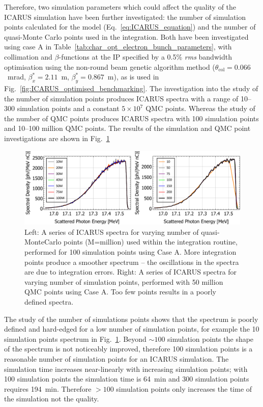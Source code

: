 \documentclass[../main.tex]{subfiles}
\begin{document}
Therefore, two simulation parameters which could affect the quality of the \textsc{ICARUS} simulation have been further investigated: the number of simulation points calculated for the model (Eq.~\ref{eq:ICARUS_equation}) and the number of quasi-Monte Carlo points used in the integration. Both have been investigated using case A in Table~\ref{tab:char_opt_electron_bunch_parameters}, with collimation and $\beta$-functions at the IP specified by a 0.5\% \textit{rms} bandwidth optimisation using the non-round beam genetic algorithm method ($\theta_{\mathrm{col}}=0.066$~\si{\milli\radian}, $\beta_{x}^{*}=2.11$~\si{\meter}, $\beta_{y}^{*}=0.867$~\si{\meter}), as is used in Fig.~\ref{fig:ICARUS_optimised_benchmarking}. The investigation into the study of the number of simulation points produces \textsc{ICARUS} spectra with a range of 10--300 simulation points and a constant $5\times 10^{7}$ QMC points. Whereas the study of the number of QMC points produces \textsc{ICARUS} spectra with 100 simulation points and 10--100 million QMC points. The results of the simulation and QMC point investigations are shown in Fig.~\ref{fig:ICARUS_sim_qmc_points}

\begin{figure}[!h]
\centering
\includegraphics[width=\textwidth]{Figures/Optimisation_and_Characterisation_of_Inverse_Compton_Scattering_Sources/QMC_SIM_POINT_STUDY.pdf}
\caption{Left: A series of \textsc{ICARUS} spectra for varying number of quasi-MonteCarlo points (M=million) used within the integration routine, performed for 100 simulation points using Case A. More integration points produce a smoother spectrum -- the oscillations in the spectra are due to integration errors. Right: A series of \textsc{ICARUS} spectra for varying number of simulation points, performed with 50 million QMC points using Case A. Too few points results in a poorly defined spectra.}
\label{fig:ICARUS_sim_qmc_points}
\end{figure}

The study of the number of simulations points shows that the spectrum is poorly defined and hard-edged for a low number of simulation points, for example the 10 simulation points spectrum in Fig.~\ref{fig:ICARUS_sim_qmc_points}. Beyond $\sim100$ simulation points the shape of the spectrum is not noticeably improved, therefore 100 simulation points is a reasonable number of simulation points for an \textsc{ICARUS} simulation. The simulation time increases near-linearly with increasing simulation points; with 100 simulation points the simulation time is 64~\si{\minute} and 300 simulation points requires 194~\si{\minute}. Therefore $>100$ simulation points only increases the time of the simulation not the quality.
\end{document}
